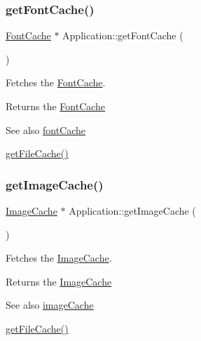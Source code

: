 \subsubsection{\texorpdfstring{getFontCache()}{getFontCache()}}
{\footnotesize\ttfamily \mbox{\hyperlink{classsage_1_1FontCache}{Font\+Cache}} $\ast$ Application\+::get\+Font\+Cache (\begin{DoxyParamCaption}{ }\end{DoxyParamCaption})}



Fetches the \mbox{\hyperlink{classsage_1_1FontCache}{Font\+Cache}}. 

\begin{DoxyReturn}{Returns}
the \mbox{\hyperlink{classsage_1_1FontCache}{Font\+Cache}} 
\end{DoxyReturn}
\begin{DoxySeeAlso}{See also}
\mbox{\hyperlink{classsage_1_1Application_a998309542a632e444d9a7d9ef6e5d5bf}{font\+Cache}} 

\mbox{\hyperlink{classsage_1_1Application_a782edaec320c507870814d8576f84fba}{get\+File\+Cache()}} 
\end{DoxySeeAlso}
\mbox{\label{classsage_1_1Application_a3c8156460d822447b22835bc4879c1a1}} 
\subsubsection{\texorpdfstring{getImageCache()}{getImageCache()}}
{\footnotesize\ttfamily \mbox{\hyperlink{classsage_1_1ImageCache}{Image\+Cache}} $\ast$ Application\+::get\+Image\+Cache (\begin{DoxyParamCaption}{ }\end{DoxyParamCaption})}



Fetches the \mbox{\hyperlink{classsage_1_1ImageCache}{Image\+Cache}}. 

\begin{DoxyReturn}{Returns}
the \mbox{\hyperlink{classsage_1_1ImageCache}{Image\+Cache}} 
\end{DoxyReturn}
\begin{DoxySeeAlso}{See also}
\mbox{\hyperlink{classsage_1_1Application_ab335f3e9f82d3648878128a75caeb89b}{image\+Cache}} 

\mbox{\hyperlink{classsage_1_1Application_a782edaec320c507870814d8576f84fba}{get\+File\+Cache()}} 
\end{DoxySeeAlso}
\mbox{\label{classsage_1_1Application_a4eaac489d4247bd184e17fa0aa6c858c}} 
